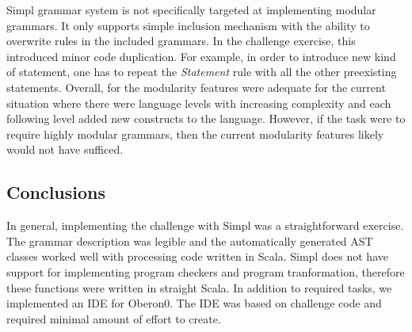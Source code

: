 Simpl grammar system is not specifically targeted at implementing
modular grammars. It only supports simple inclusion mechanism with
the ability to overwrite rules in the included grammars. In the challenge
exercise, this introduced minor code duplication. For example, in
order to introduce new kind of statement, one has to repeat the \emph{Statement}
rule with all the other preexisting statements. Overall, for the modularity
features were adequate for the current situation where there were
language levels with increasing complexity and each following level
added new constructs to the language. However, if the task were to
require highly modular grammars, then the current modularity features
likely would not have sufficed.


\subsection{Conclusions}

In general, implementing the challenge with Simpl was a straightforward
exercise. The grammar description was legible and the automatically
generated AST classes worked well with processing code written in
Scala. Simpl does not have support for implementing program checkers
and program tranformation, therefore these functions were written
in straight Scala. In addition to required tasks, we implemented an
IDE for Oberon0. The IDE was based on challenge code and required
minimal amount of effort to create.

